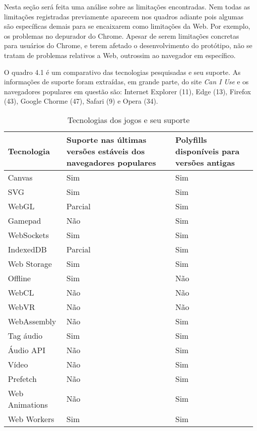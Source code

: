 Nesta seção será feita uma análise sobre as limitações
encontradas. Nem todas as limitações registradas previamente aparecem
nos quadros adiante pois algumas são específicas demais para se
encaixarem como limitações da Web. Por exemplo, os problemas no
depurador do Chrome. Apesar de serem limitações concretas para
usuários do Chrome, e terem afetado o desenvolvimento do protótipo,
não se tratam de problemas relativos a Web, outrossim ao navegador em
específico.

O quadro 4.1 é um comparativo das tecnologias pesquisadas e seu
suporte. As informações de suporte foram extraídas, em grande parte, do site
\textit{Can I Use} e os navegadores populares em questão são: Internet
Explorer (11), Edge (13), Firefox (43), Google Chorme (47), Safari (9) e
Opera (34).

\begin{table}[H]
\begin{tabular}{ |p{3cm}|p{3cm}|p{3cm}|  }
\hline
Tecnologia & Suporte nas últimas versões estáveis dos navegadores populares & Polyfills disponíveis  para versões antigas \\ \hline
Canvas & Sim & Sim \\ \hline
SVG & Sim & Sim \\ \hline
WebGL & Parcial & Sim \\ \hline
Gamepad & Não & Sim \\ \hline
WebSockets & Sim & Sim \\ \hline
IndexedDB & Parcial & Sim \\ \hline
Web Storage & Sim & Sim \\ \hline
Offline & Sim & Não \\ \hline
WebCL & Não & Não \\ \hline
WebVR & Não & Não \\ \hline
WebAssembly & Não & Sim \\ \hline
Tag áudio & Sim & Sim \\ \hline
Áudio API & Não & Sim \\ \hline
Vídeo & Não & Sim \\ \hline
Prefetch & Não & Sim \\ \hline
Web Animations & Não & Sim \\ \hline
Web Workers & Sim & Sim\\ \hline
\end{tabular}
\label{table:apisSupport}
\caption{Tecnologias dos jogos e seu suporte}
\end{table}


